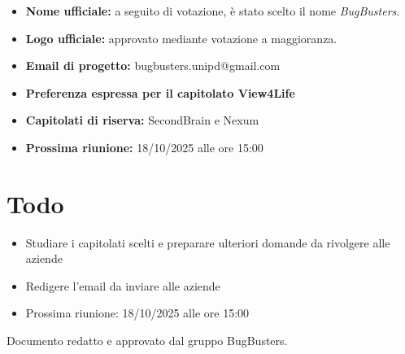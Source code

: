 \documentclass[a4paper,12pt]{article}
\begin{document}
\begin{itemize}
    \item \textbf{Nome ufficiale:} a seguito di votazione, è stato scelto il nome \emph{BugBusters}.
    \item \textbf{Logo ufficiale:} approvato mediante votazione a maggioranza.
    \item \textbf{Email di progetto:} {\small\textsf{bugbusters.unipd@gmail.com}}
    \item \textbf{Preferenza espressa per il capitolato View4Life}
    \item \textbf{Capitolati di riserva:} SecondBrain e Nexum
    \item \textbf{Prossima riunione:} 18/10/2025 alle ore 15:00
\end{itemize}

\section{Todo}

\begin{tcolorbox}[colback=secondaryblue!8,colframe=secondaryblue!60,arc=2mm,boxrule=0.5pt,left=10pt,right=10pt]
\begin{itemize}[topsep=5pt]
    \item Studiare i capitolati scelti e preparare ulteriori domande da rivolgere alle aziende
    \item Redigere l'email da inviare alle aziende
    \item Prossima riunione: 18/10/2025 alle ore 15:00
\end{itemize}
\end{tcolorbox}

\vfill
\begin{center}
    {\small\color{darkgray} Documento redatto e approvato dal gruppo BugBusters.}
\end{center}
\end{document}
